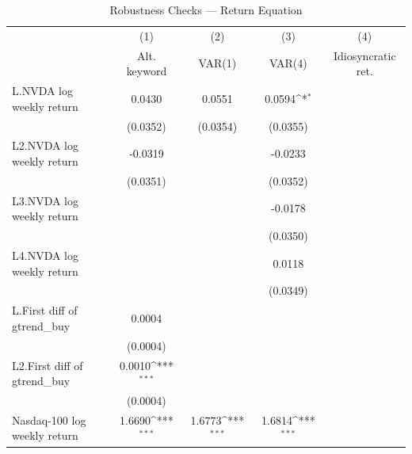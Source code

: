 \begin{table}[htbp]\centering
\def\sym#1{\ifmmode^{#1}\else\(^{#1}\)\fi}
\caption{Robustness Checks — Return Equation}
\begin{tabular}{l*{4}{c}}
\toprule
                    &\multicolumn{1}{c}{(1)}&\multicolumn{1}{c}{(2)}&\multicolumn{1}{c}{(3)}&\multicolumn{1}{c}{(4)}\\
                    &\multicolumn{1}{c}{Alt. keyword}&\multicolumn{1}{c}{VAR(1)}&\multicolumn{1}{c}{VAR(4)}&\multicolumn{1}{c}{Idiosyncratic ret.}\\
\midrule
L.NVDA log weekly return&      0.0430         &      0.0551         &      0.0594\sym{*}  &                     \\
                    &    (0.0352)         &    (0.0354)         &    (0.0355)         &                     \\
\addlinespace
L2.NVDA log weekly return&     -0.0319         &                     &     -0.0233         &                     \\
                    &    (0.0351)         &                     &    (0.0352)         &                     \\
\addlinespace
L3.NVDA log weekly return&                     &                     &     -0.0178         &                     \\
                    &                     &                     &    (0.0350)         &                     \\
\addlinespace
L4.NVDA log weekly return&                     &                     &      0.0118         &                     \\
                    &                     &                     &    (0.0349)         &                     \\
\addlinespace
L.First diff of gtrend\_buy&      0.0004         &                     &                     &                     \\
                    &    (0.0004)         &                     &                     &                     \\
\addlinespace
L2.First diff of gtrend\_buy&      0.0010\sym{***}&                     &                     &                     \\
                    &    (0.0004)         &                     &                     &                     \\
\addlinespace
Nasdaq-100 log weekly return&      1.6690\sym{***}&      1.6773\sym{***}&      1.6814\sym{***}&                     \\

\end{tabular}
\end{table}

